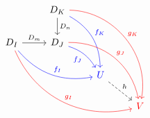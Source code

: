 \[
    \begin{tikzcd}
      & D_K \arrow{d}{D_n}
      \arrow[bend left=30,color=blue]{ddr}{f_K}
      \arrow[bend left=50,color=red]{dddrr}{g_K} & & \\
      D_I \arrow{r}{D_m}
      \arrow[bend right=30,color=blue]{drr}{f_I}
      \arrow[bend right=40,color=red]{ddrrr}{g_I} &
      D_J \arrow[bend left=20,swap, color=blue]{dr}{f_J}
      \arrow[bend left=40,color=red]{ddrr}{g_J} & & \\
      & & {\color{blue}U} \arrow[dashed]{dr}{h}& \\
      & & & {\color{red}V}
    \end{tikzcd}
\]



